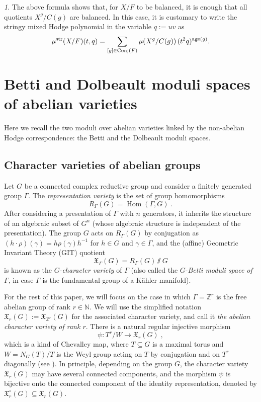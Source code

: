 \documentclass[11pt,english]{amsart}
\numberwithin{equation}{section}
\numberwithin{figure}{section}
\theoremstyle{plain}
\theoremstyle{plain}
\theoremstyle{definition}
\theoremstyle{remark}
\newtheorem{rem}[thm]{\protect\remarkname}
\newcommand{\ZZ}{\mathbb{Z}}
\newcommand{\NN}{\mathbb{N}}
\newcommand{\Hom}{\operatorname{Hom}}
\newcommand{\age}{\operatorname{age}}
\newcommand{\str}{\textup{str}}
\providecommand{\remarkname}{Remark}
\begin{document}
\begin{rem}
The above formula shows that, for $X/F$ to be balanced, it is enough that all quotients $X^g/C(g)$ are balanced. In this case, it is customary to write the stringy mixed Hodge polynomial in the variable $q := uv$ as
$$
    \mu^{\str}(X/F)(t, q) = \sum_{[g] \in \text{Conj}(F)} \mu(X^g / C(g))\, (t^2q)^{\age(g)}.
$$
\end{rem}

\section{Betti and Dolbeault moduli spaces of abelian varieties}\label{sec:Betti-Dolbeault}

Here we recall the two moduli over abelian varieties linked by the non-abelian Hodge correspondence: the Betti and the Dolbeault moduli spaces. 

\subsection{Character varieties of abelian groups}

Let $G$ be a connected complex reductive group and consider a finitely generated
group $\Gamma$. The \emph{representation variety} is the set of group
homomorphisms 
\[
R_{\Gamma}(G)=\Hom(\Gamma,G)\; .
\]
After considering a presentation of $\Gamma$ with $n$ generators, it inherits the structure of an algebraic subset of $G^{n}$ (whose algebraic structure is independent of the presentation). The
group $G$ acts on $R_{\Gamma}(G)$ by conjugation as $(h\cdot\rho)(\gamma)=h\rho(\gamma)h^{-1}$
for $h\in G$ and $\gamma\in\Gamma$, and the (affine) Geometric Invariant
Theory (GIT) quotient 
\[
\mathfrak{X}_{\Gamma}(G)=R_\Gamma(G)\sslash G
\]
is known as the $G$-\emph{character variety} of $\Gamma$ (also called the $G$-\emph{Betti moduli space of $\Gamma$}, in case $\Gamma$ is the fundamental group of a K\"ahler manifold).

For the rest of this paper, we will focus on the case in which $\Gamma=\ZZ^{r}$
is the free abelian group of rank $r\in\NN$.
We will use the simplified notation $\mathfrak{X}_{r}(G):=\mathfrak{X}_{\ZZ^{r}}(G)$ for the associated character
variety, and call it \emph{the abelian character variety of rank $r$}. There is a natural regular injective morphism 
\[
\psi: T^{r}/W \longrightarrow \mathfrak{X}_r(G)\; ,
\]
which is a kind of Chevalley map, where $T\subseteq G$ is a maximal torus and $W=N_{G}(T)/T$ is the
Weyl group acting on $T$ by conjugation and on $T^{r}$ diagonally (see \cite{Si,GPZ}). In principle, depending on the group $G$, the character variety $\mathfrak{X}_r(G)$ may have several connected components, and the morphism $\psi$ is bijective onto the connected component of the identity representation, denoted by $\mathfrak{X}_r^\circ(G) \subseteq \mathfrak{X}_r(G)$.
\end{document}
